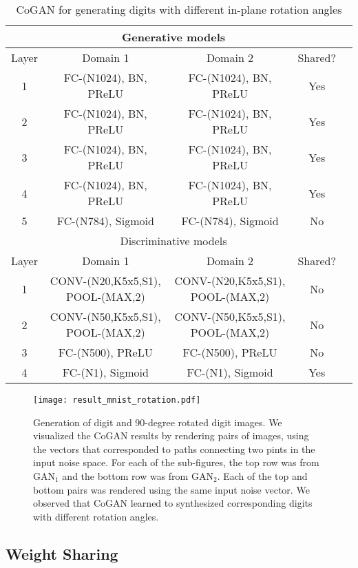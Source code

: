 \documentclass{article}
\begin{document}
\begin{table*}[thb!]
\small
\centering
{
\caption{CoGAN for generating digits with different in-plane rotation angles}
\label{tbl::mnist_rotation}
\begin{tabular}{|c|c|c|c|c|}
\hline
\multicolumn{4}{|c|}{Generative models}\\
\hline\rule{0pt}{2ex}    
Layer &  Domain 1 & Domain 2 & Shared? \\
\hline 
1 &  FC-(N1024), BN, PReLU & FC-(N1024), BN, PReLU & Yes\\
2 &  FC-(N1024), BN, PReLU & FC-(N1024), BN, PReLU &Yes\\
3 &  FC-(N1024), BN, PReLU & FC-(N1024), BN, PReLU &Yes\\
4 &  FC-(N1024), BN, PReLU & FC-(N1024), BN, PReLU &Yes\\
5 &  FC-(N784), Sigmoid & FC-(N784), Sigmoid & No\\
\hline
\hline
\multicolumn{4}{|c|}{Discriminative models}\\
\hline\rule{0pt}{2ex} 
Layer &  Domain 1 & Domain 2 & Shared? \\
\hline
1 & CONV-(N20,K5x5,S1), POOL-(MAX,2) & CONV-(N20,K5x5,S1), POOL-(MAX,2) &No\\
2 & CONV-(N50,K5x5,S1), POOL-(MAX,2) & CONV-(N50,K5x5,S1), POOL-(MAX,2) &No\\
3 & FC-(N500), PReLU & FC-(N500), PReLU &No\\
4 & FC-(N1), Sigmoid & FC-(N1), Sigmoid &Yes\\
\hline
\end{tabular}
}
\end{table*}
\begin{figure}[thb!]
\centering
\texttt{[image: result\_mnist\_rotation.pdf]}
\caption{Generation of digit and 90-degree rotated digit images. We visualized the CoGAN results by rendering pairs of images, using the vectors that corresponded to paths connecting two pints in the input noise space. For each of the sub-figures, the top row was from $\text{GAN}_1$ and the bottom row was from $\text{GAN}_2$. Each of the top and bottom pairs was rendered using the same input noise vector. We observed that CoGAN learned to synthesized corresponding digits with different rotation angles.}
\label{fig::result_mnist_rotation}
\end{figure}

\subsection{Weight Sharing}\label{subsec::sharing}
\end{document}

